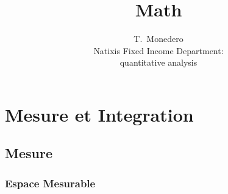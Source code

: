 \documentclass[3pt]{article}
\begin{document}
\title{Math}
\author{T.\ Monedero \\
Natixis Fixed Income Department:\\
quantitative analysis }
\maketitle

\begin{abstract}
\end{abstract}

\tableofcontents

\bigskip 

\bigskip 

\bigskip 

\bigskip 

\bigskip 

\bigskip 

\bigskip 

\bigskip 

\bigskip 

\bigskip 

\bigskip 

\bigskip 

\bigskip 

\bigskip 

\bigskip 

\bigskip 

\bigskip 

\bigskip 

\section{Mesure et Integration}

\bigskip

\subsection{Mesure}

\subsubsection{Espace Mesurable}

\bigskip 
\end{document}
